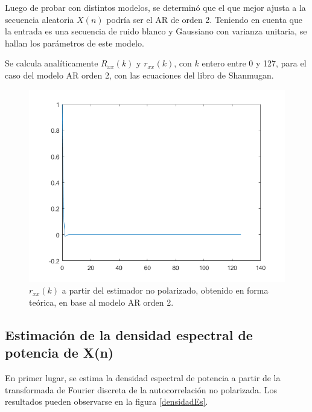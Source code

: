 Luego de probar con distintos modelos, se determin\'o que el que mejor ajusta a la secuencia aleatoria $X(n)$ podr\'ia ser el AR de orden 2. Teniendo en cuenta que la entrada es una secuencia de ruido blanco y Gaussiano con varianza unitaria, se hallan los par\'ametros de este modelo.

Se calcula anal\'iticamente $R_{xx}(k)$ y $ r_{xx}(k) $, con $k$ entero entre 0 y 127, para el caso del modelo AR orden 2, con las ecuaciones del libro de Shanmugan. %

\begin{figure}[H] %
\centering
\includegraphics[scale=0.45]{../EJ1/rxxNPteorico}
\caption{$r_{xx}(k)$ a partir del estimador no polarizado, obtenido en forma teórica, en base al modelo AR orden 2.}
\label{rxxTeo}
\end{figure}


\subsection{Estimaci\'on de la densidad espectral de potencia de X(n)}

En primer lugar, se estima la densidad espectral de potencia a partir de la transformada de Fourier discreta de la autocorrelación no polarizada. Los resultados pueden observarse en la figura \ref{densidadEs}.

